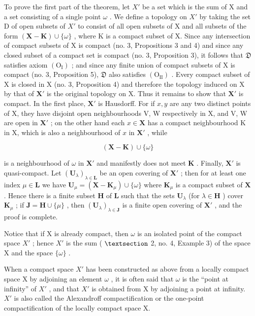 To prove the first part of the theorem, let \(X'\) be a set which is the sum of X and a set consisting of a single point \(\omega\) . We define a topology on \(X'\) by taking the set D of open subsets of \(X'\) to consist of all open subsets of X and all subsets of the form \((\mathbf{X}-\mathbf{K})\cup\{\omega\}\) , where K is a compact subset of X. Since any intersection of compact subsets of X is compact (no. 3, Propositions 3 and 4) and since any closed subset of a compact set is compact (no. 3, Proposition 3), it follows that \(\mathfrak{D}\) satisfies axiom \((\mathrm{O_I})\) ; and since any finite union of compact subsets of X is compact (no. 3, Proposition 5), \(\mathfrak{D}\) also satisfies \((\mathrm{O_{II}})\) . Every compact subset of X is closed in X (no. 3, Proposition 4) and therefore the topology induced on X by that of \(\mathbf{X}'\) is the original topology on X. Thus it remains to show that \(\mathbf{X}'\) is compact. In the first place, \(\mathbf{X}'\) is Hausdorff. For if \(x, y\) are any two distinct points of X, they have disjoint open neighbourhoods V, W respectively in X, and V, W are open in \(\mathbf{X}'\) ; on the other hand each \(x \in \mathbf{X}\) has a compact neighbourhood K in X, which is also a neighbourhood of \(x\) in \(\mathbf{X}'\) , while

\[
(\mathbf {X} - \mathbf {K}) \cup \{\omega \}
\]

is a neighbourhood of \(\omega\) in \(\mathbf{X}'\) and manifestly does not meet \(\mathbf{K}\) . Finally, \(\mathbf{X}'\) is quasi-compact. Let \((\mathbf{U}_{\lambda})_{\lambda \in \mathbf{L}}\) be an open covering of \(\mathbf{X}'\) ; then for at least one index \(\mu \in \mathbf{L}\) we have \(\mathbf{U}_{\mu} = (\mathbf{X} - \mathbf{K}_{\mu}) \cup \{\omega\}\) where \(\mathbf{K}_{\mu}\) is a compact subset of \(\mathbf{X}\) . Hence there is a finite subset \(\mathbf{H}\) of \(\mathbf{L}\) such that the sets \(\mathbf{U}_{\lambda}\) (for \(\lambda \in \mathbf{H}\) ) cover \(\mathbf{K}_{\mu}\) ; if \(\mathbf{J} = \mathbf{H} \cup \{\mu\}\) , then \((\mathbf{U}_{\lambda})_{\lambda \in \mathbf{J}}\) is a finite open covering of \(\mathbf{X}'\) , and the proof is complete.

Notice that if X is already compact, then \(\omega\) is an isolated point of the compact space \(X'\) ; hence \(X'\) is the sum ( \(\S\) 2, no. 4, Example 3) of the space X and the space \(\{\omega\}\) .

When a compact space \(X'\) has been constructed as above from a locally compact space X by adjoining an element \(\omega\) , it is often said that \(\omega\) is the ``point at infinity'' of \(X'\) , and that \(X'\) is obtained from X by adjoining a point at infinity. \(X'\) is also called the Alexandroff compactification or the one-point compactification of the locally compact space X.

